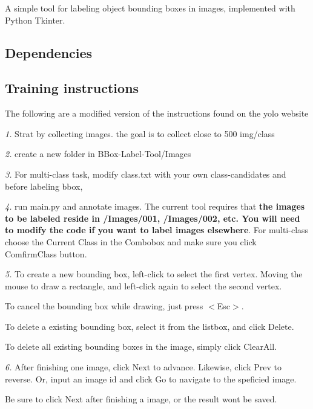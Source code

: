 A simple tool for labeling object bounding boxes in images, implemented with Python Tkinter.

\subsection*{Dependencies}


\begin{DoxyCode}{0}
\end{DoxyCode}


\subsection*{Training instructions}

The following are a modified version of the instructions found on the yolo website

{\itshape 1.} Strat by collecting images. the goal is to collect close to 500 img/class

{\itshape 2.} create a new folder in B\+Box-\/\+Label-\/\+Tool/\+Images

{\itshape 3.} For multi-\/class task, modify \textquotesingle{}class.\+txt\textquotesingle{} with your own class-\/candidates and before labeling bbox,

{\itshape 4.} run main.\+py and annotate images. The current tool requires that {\bfseries{the images to be labeled reside in /\+Images/001, /\+Images/002, etc. You will need to modify the code if you want to label images elsewhere}}. For multi-\/class choose the \textquotesingle{}Current Class\textquotesingle{} in the Combobox and make sure you click \textquotesingle{}Comfirm\+Class\textquotesingle{} button.

{\itshape 5.} To create a new bounding box, left-\/click to select the first vertex. Moving the mouse to draw a rectangle, and left-\/click again to select the second vertex.
\begin{DoxyItemize}
\item To cancel the bounding box while drawing, just press {\ttfamily $<$Esc$>$}.
\item To delete a existing bounding box, select it from the listbox, and click {\ttfamily Delete}.
\item To delete all existing bounding boxes in the image, simply click {\ttfamily Clear\+All}.
\end{DoxyItemize}

{\itshape 6.} After finishing one image, click {\ttfamily Next} to advance. Likewise, click {\ttfamily Prev} to reverse. Or, input an image id and click {\ttfamily Go} to navigate to the speficied image.
\begin{DoxyItemize}
\item Be sure to click {\ttfamily Next} after finishing a image, or the result won\textquotesingle{}t be saved.
\end{DoxyItemize}

